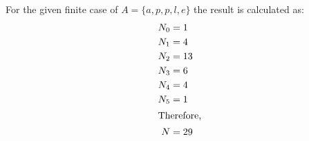 \documentclass[]{article}
\begin{document}
For the given finite case of $A = \{a,p,p,l,e\}$ the result is calculated as:
\begin{align*}
	N_0 &= 1\\
	N_1 &= 4\\
	N_2 &= 13\\
	N_3 &= 6\\
	N_4 &= 4\\
	N_5 &= 1\\
	\intertext{Therefore,}
	N &= 29
\end{align*}



\end{document}
